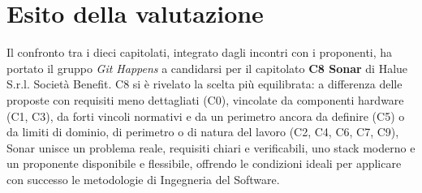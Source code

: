 \section{Esito della valutazione}

Il confronto tra i dieci capitolati, integrato dagli incontri con i proponenti, ha portato il gruppo \emph{Git Happens} a candidarsi per il capitolato \textbf{C8 Sonar} di Halue S.r.l. Società Benefit. C8 si è rivelato la scelta più equilibrata: a differenza delle proposte con requisiti meno dettagliati (C0), vincolate da componenti hardware (C1, C3), da forti vincoli normativi e da un perimetro ancora da definire (C5) o da limiti di dominio, di perimetro o di natura del lavoro (C2, C4, C6, C7, C9), Sonar unisce un problema reale, requisiti chiari e verificabili, uno stack moderno e un proponente disponibile e flessibile, offrendo le condizioni ideali per applicare con successo le metodologie di Ingegneria del Software.
